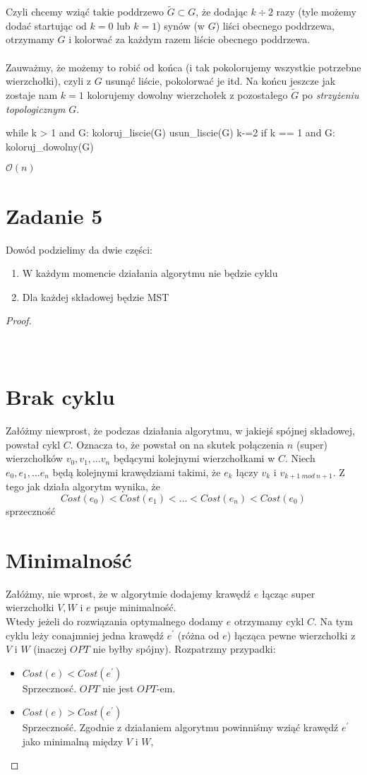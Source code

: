 \documentclass{article}
\begin{document}
Czyli chcemy wziąć takie poddrzewo $\widetilde{G} \subset G$, że dodając $k \div 2$ razy (tyle możemy dodać startując od $k=0$ lub $k=1$) synów (w $G$) liści obecnego poddrzewa, otrzymamy $G$ i kolorwać za każdym razem liście obecnego poddrzewa.\\\\
Zauważmy, że możemy to robić od końca (i tak pokolorujemy wszystkie potrzebne wierzchołki), czyli z $G$ usunąć liście, pokolorwać je itd. Na końcu jeszcze jak zostaje nam $k = 1$ kolorujemy dowolny wierzchołek z pozostałego $\widetilde{G}$ po \textit{strzyżeniu topologicznym} $G$.
\begin{python}
while k > 1 and G:
    koloruj_liscie(G)
    usun_liscie(G)
    k-=2
if k == 1 and G:
    koloruj_dowolny(G)
\end{python}
$\mathcal{O}(n)$
\clearpage
\section{Zadanie 5}
Dowód podzielimy da dwie części:
\begin{enumerate}
    \item W każdym momencie działania algorytmu nie będzie cyklu
    \item Dla każdej składowej będzie MST
\end{enumerate}
\begin{proof}
\section*{\\Brak cyklu}
Załóżmy niewprost, że podczas działania  algorytmu, w jakiejś  spójnej składowej,  powstał cykl $C$. Oznacza to, że powstał on na skutek połączenia $n$ (super) wierzchołków $v_0, v_1, \dots v_n$ będącymi kolejnymi wierzchołkami w $C$. Niech $e_0, e_1, \dots  e_n$ będą kolejnymi krawędziami takimi, że $e_k$ łączy $v_k$ i $v_{k+1\ mod\ n+1}$. Z tego jak działa algorytm wynika, że 
$$Cost(e_0) < Cost(e_1) < \ldots < Cost(e_n) < Cost(e_0)$$ sprzeczność
\section*{Minimalność}
Załóżmy, nie wprost, że w algorytmie dodajemy krawędź $e$ łącząc super wierzchołki $V, W$ i $e$ psuje minimalność.\\
Wtedy jeżeli do rozwiązania optymalnego dodamy $e$ otrzymamy cykl $C$. Na tym cyklu leży conajmniej jedna krawędź $e^\prime$ (różna od $e$) łącząca pewne wierzchołki z $V$ i $W$ (inaczej $OPT$ nie byłby spójny). Rozpatrzmy przypadki:
\begin{itemize}
    \item $Cost(e) < Cost(e^\prime)$ \\ Sprzecznosć. $OPT$ nie jest $OPT$-em.
    \item $Cost(e) > Cost(e^\prime)$ \\ Sprzeczność. Zgodnie z działaniem algorytmu powinniśmy wziąć krawędź $e^\prime$ jako minimalną między $V$ i $W$,
\end{itemize}
\end{proof}
\end{document}
